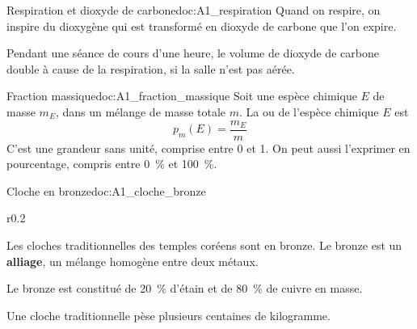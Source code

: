 \begin{doc}{Respiration et dioxyde de carbone}{doc:A1_respiration}
  Quand on respire, on inspire du dioxygène  qui est transformé en dioxyde de carbone  que l'on expire.

  Pendant une séance de cours d'une heure, le volume de dioxyde de carbone  double à cause de la respiration, si la salle n'est pas aérée.
\end{doc}



\begin{doc}{Fraction massique}{doc:A1_fraction_massique}
  Soit une espèce chimique $E$ de masse $m_E$, dans un mélange de masse totale $m$.
  La  ou  de l'espèce chimique $E$ est
  \begin{equation*}
    p_{m}(E) = \frac{m_E}{m}
  \end{equation*}
  C'est une grandeur sans unité, comprise entre 0 et 1.
  On peut aussi l'exprimer en pourcentage, compris entre \qty{0}{\percent} et \qty{100}{\percent}.
\end{doc}

\begin{doc}{Cloche en bronze}{doc:A1_cloche_bronze}
  \begin{wrapfigure}[5]{r}{0.2\linewidth}
    \vspace*{-31pt}
    \centering
  \end{wrapfigure}
  
  Les cloches traditionnelles des temples coréens sont en bronze.
  Le bronze est un \textbf{alliage}, un mélange homogène entre deux métaux.
  
  Le bronze est constitué de \qty{20}{\percent} d'étain  et de \qty{80}{\percent} de cuivre  en masse.

  Une cloche traditionnelle pèse plusieurs centaines de kilogramme.
\end{doc}





